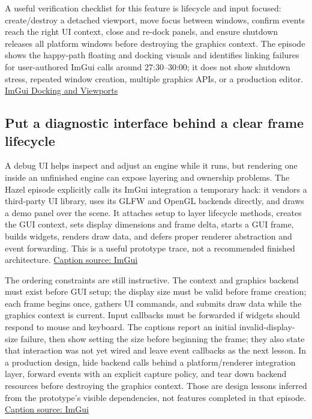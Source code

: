 A useful verification checklist for this feature is lifecycle and input focused: create/destroy a detached viewport, move focus between windows, confirm events reach the right UI context, close and re-dock panels, and ensure shutdown releases all platform windows before destroying the graphics context. The episode shows the happy-path floating and docking visuals and identifies linking failures for user-authored ImGui calls around 27:30--30:00; it does not show shutdown stress, repeated window creation, multiple graphics APIs, or a production editor. \href{https://www.youtube.com/watch?v=lZuje-3iyVE&t=1650s}{ImGui Docking and Viewports}

\subsection{Put a diagnostic interface behind a clear frame lifecycle}\label{06-engine-ii-ch032-put-a-diagnostic-interface-behind-a-clear-frame-lifecycle}

\hypertarget{06-engine-ii-ch032-put-a-diagnostic-interface-behind-a-clear-frame-lifecycle}{}

A debug UI helps inspect and adjust an engine while it runs, but rendering one inside an unfinished engine can expose layering and ownership problems. The Hazel episode explicitly calls its ImGui integration a temporary hack: it vendors a third-party UI library, uses its GLFW and OpenGL backends directly, and draws a demo panel over the scene. It attaches setup to layer lifecycle methods, creates the GUI context, sets display dimensions and frame delta, starts a GUI frame, builds widgets, renders draw data, and defers proper renderer abstraction and event forwarding. This is a useful prototype trace, not a recommended finished architecture. \href{https://www.youtube.com/watch?v=st4lgNI6_F4}{Caption source: ImGui}

The ordering constraints are still instructive. The context and graphics backend must exist before GUI setup; the display size must be valid before frame creation; each frame begins once, gathers UI commands, and submits draw data while the graphics context is current. Input callbacks must be forwarded if widgets should respond to mouse and keyboard. The captions report an initial invalid-display-size failure, then show setting the size before beginning the frame; they also state that interaction was not yet wired and leave event callbacks as the next lesson. In a production design, hide backend calls behind a platform/renderer integration layer, forward events with an explicit capture policy, and tear down backend resources before destroying the graphics context. Those are design lessons inferred from the prototype's visible dependencies, not features completed in that episode. \href{https://www.youtube.com/watch?v=st4lgNI6_F4}{Caption source: ImGui}

